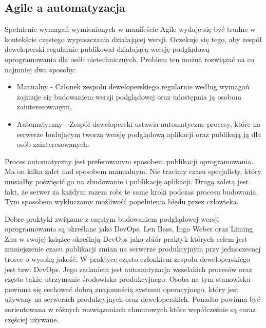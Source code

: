 \subsection{Agile a automatyzacja}
Spełnienie wymagań wymienionych w manifeście Agile wydaje się być trudne w kontekście częstego wypuszczania działającej wersji. Oczekuje się tego, aby zespół deweloperski regularnie publikował działającą wersję podglądową oprogramowania dla osób nietechnicznych. Problem ten można rozwiązać na co najmniej dwa sposoby:
\begin{itemize}
    \item Manualny - Członek zespołu deweloperskiego regularnie według wymagań zajmuje się budowaniem wersji podglądowej oraz udostępnia ją osobom zainteresowanym,
    \item Automatyczny - Zespół deweloperski ustawia automatyczne procesy, które na serwerze budującym tworzą wersję podglądową aplikacji oraz publikują ją dla osób zainteresowanych.
\end{itemize}
Proces automatyczny jest preferowanym sposobem publikacji oprogramowania. Ma on kilka zalet nad sposobem manualnym. Nie tracimy czasu specjalisty, który musiałby poświęcić go na zbudowanie i publikację aplikacji. Drugą zaletą jest fakt, że serwer za każdym razem robi te same kroki podczas procesu budowania. Tym sposobem wykluczamy możliwość popełnienia błędu przez człowieka.
\par
Dobre praktyki związane z częstym budowaniem podglądowej wersji oprogramowania są określane jako DevOps. Len Bass, Ingo Weber oraz Liming Zhu w swojej książce \cite{DevOpsBook} określają DevOps jako zbiór praktyk których celem jest zmniejszenie czasu publikacji zmian na serwerze produkcyjnym przy jednoczesnej trosce o wysoką jakość. W praktyce często członkiem zespołu deweloperskiego jest tzw. DevOps. Jego zadaniem jest automatyzacja wszelakich procesów oraz często także utrzymanie środowiska produkcyjnego. Osoba na tym stanowisku powinna się cechować dobrą znajomością systemu operacyjnego, który jest używany na serwerach produkcyjnych oraz deweloperskich. Ponadto powinna być zorientowana w różnych rozwiązaniach chmurowych które współcześnie są coraz częściej używane.
